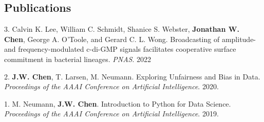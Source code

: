 \documentclass[line,margin]{res}
\begin{document}
\begin{resume}


\section{\sc Publications}


\begin{list}{*}{}

\item[3.] Calvin K. Lee, William C. Schmidt, Shanice S. Webster, \textbf{Jonathan W. Chen}, George A. O'Toole, and Gerard C. L. Wong.
Broadcasting of amplitude- and frequency-modulated c-di-GMP signals facilitates
cooperative surface commitment in bacterial lineages. \textit{PNAS}. 2022

\item[2.] \textbf{J.W. Chen}, T. Larsen, M. Neumann.
Exploring Unfairness and Bias in Data. \textit{Proceedings of the AAAI
Conference on Artificial Intelligence}. 2020.

\item[1.] M. Neumann, \textbf{J.W. Chen}. Introduction to Python for Data Science.
\textit{Proceedings of the AAAI Conference on Artificial Intelligence}. 2019.

\end{list}




\end{resume}
\end{document}
